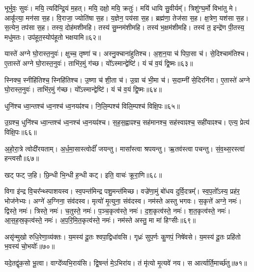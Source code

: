 भूर्भुवः॒ सुवः॑। 
मयि॒ त्यदि॑न्द्रि॒यं म॒हत्। 
मयि॒ दक्षो॒ मयि॒ क्रतुः॑। 
मयि॑ धायि सु॒वीर्यम्᳚। 
त्रिशु॑ग्घ॒र्मो विभा॑तु मे। 
आकू᳚त्या॒ मन॑सा स॒ह। 
वि॒राजा॒ ज्योति॑षा स॒ह। 
य॒ज्ञेन॒ पय॑सा स॒ह। 
ब्रह्म॑णा॒ तेज॑सा स॒ह। 
क्ष॒त्रेण॒ यश॑सा स॒ह। 
स॒त्येन॒ तप॑सा स॒ह। 
तस्य॒ दोह॑मशीमहि। 
तस्य॑ सु॒म्नम॑शीमहि। 
तस्य॑ भ॒क्षम॑शीमहि। 
तस्य॑ त॒ इन्द्रे॑ण पी॒तस्य॒ मधु॑मतः। 
उप॑हूत॒स्योप॑हूतो भक्षयामि॥६२॥
\anuvakamend[यश॑सा स॒ह षट्च॑]

यास्ते॑ अग्ने घो॒रास्त॒नुवः॑। 
क्षुच्च॒ तृष्णा॑ च। 
अस्नु॒क्चाना॑हुतिश्च। 
अ॒श॒न॒या च॑ पिपा॒सा च॑। 
से॒दिश्चाम॑तिश्च। 
ए॒तास्ते॑ अग्ने घो॒रास्त॒नुवः॑। 
ताभि॑र॒मुं ग॑च्छ। 
यो᳚ऽस्मान्द्वेष्टि॑। 
यं च॑ व॒यं द्वि॒ष्मः॥६३॥
\anuvakamend

स्निक्च॒ स्नीहि॑तिश्च॒ स्निहि॑तिश्च। 
उ॒ष्णा च॑ शी॒ता च॑। 
उ॒ग्रा च॑ भी॒मा च॑। 
स॒दाम्नी॑ से॒दिरनि॑रा। 
ए॒तास्ते॑ अग्ने घो॒रास्त॒नुवः॑। 
ताभि॑र॒मुं ग॑च्छ। 
यो᳚ऽस्मान्द्वेष्टि॑। 
यं च॑ व॒यं द्वि॒ष्मः॥६४॥
\anuvakamend

धुनि॑श्च ध्वा॒न्तश्च॑ ध्व॒नश्च॑ ध्व॒नयꣴ॑श्च। 
नि॒लि॒म्पश्च॑ विलि॒म्पश्च॑ विक्षि॒पः॥६५॥
\anuvakamend

उ॒ग्रश्च॒ धुनि॑श्च ध्वा॒न्तश्च॑ ध्व॒नश्च॑ ध्व॒नयꣴ॑श्च। 
स॒ह॒स॒ह्वाꣴश्च॒ सह॑मानश्च॒ सह॑स्वाꣴश्च॒ सही॑याꣴश्च। 
एत्य॒ प्रेत्य॑ विक्षि॒पः॥६६॥
\anuvakamend


अ॒हो॒रा॒त्रे त्वोदी॑रयताम्। 
अ॒र्ध॒मा॒सास्त्वोदीं᳚ जयन्तु। 
मासा᳚स्त्वा श्रपयन्तु। 
ऋ॒तव॑स्त्वा पचन्तु। 
सं॒व॒थ्स॒रस्त्वा॑ हन्त्वसौ॥६७॥
\anuvakamend

खट् फट् ज॒हि। 
छि॒न्धी भि॒न्धी ह॒न्धी कट्। 
इति॒ वाचः॑ क्रूरा॒णि॥६८॥
\anuvakamend

विगा इ॑न्द्र वि॒चर᳚न्थ्स्पाशयस्व। 
स्व॒पन्त॑मिन्द्र पशु॒मन्त॑मिच्छ। 
वज्रे॑णा॒मुं बो॑धय दुर्वि॒दत्रम्᳚। 
स्व॒प॒तो᳚ऽस्य॒ प्रह॑र॒ भोज॑नेभ्यः। 
अग्ने॑ अ॒ग्निना॒ संव॑दस्व। 
मृत्यो॑ मृ॒त्युना॒ संव॑दस्व। 
नम॑स्ते अस्तु भगवः। 
स॒कृत्ते॑ अग्ने॒ नमः॑। 
द्विस्ते॒ नमः॑। 
त्रिस्ते॒ नमः॑। 
च॒तुस्ते॒ नमः॑। 
प॒ञ्च॒कृत्व॑स्ते॒ नमः॑। 
द॒श॒कृत्व॑स्ते॒ नमः॑। 
श॒त॒कृत्व॑स्ते॒ नमः॑। 
आ॒स॒ह॒स्र॒कृत्व॑स्ते॒ नमः॑। 
अ॒प॒रि॒मि॒त॒कृत्व॑स्ते॒ नमः॑। 
नम॑स्ते अस्तु॒ मा मा॑ हिꣳसीः॥६९॥
\anuvakamend[त्रिस्ते॒ नमः॑ स॒प्त च॑]

असृ॑न्मुखो रुधि॒रेणा॒व्य॑क्तः। 
य॒मस्य॑ दू॒तः  श्वपा॒द्विधा॑वसि। 
गृध्रः॑ सुप॒र्णः कु॒णपं॒ निषे॑वसे। 
य॒मस्य॑ दू॒तः प्रहि॑तो भ॒वस्य॑ चो॒भयोः᳚॥७०॥
\anuvakamend

यदे॒तद्वृ॑क॒सो भू॒त्वा। 
वाग्दे᳚व्यभि॒राय॑सि। 
द्वि॒षन्तं॑ मे॒ऽभिरा॑य। 
तं मृ॑त्यो मृ॒त्यवे॑ नय। 
स आर्त्यार्ति॒मार्च्छ॑तु॥७१॥
\anuvakamend

